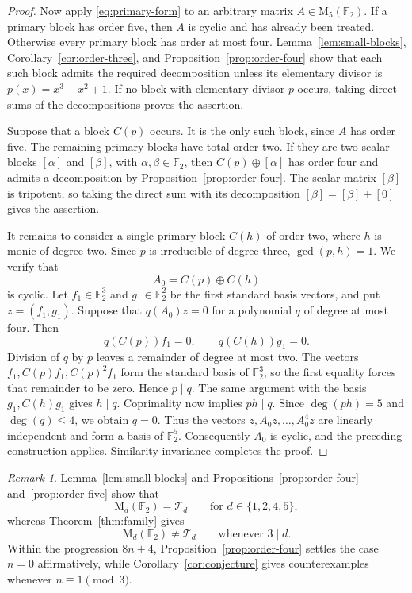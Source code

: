 \documentclass[12pt]{amsart}
\theoremstyle{remark}
\newtheorem{remark}[theorem]{Remark}
\numberwithin{equation}{section}
\theoremstyle{definition}
\newcommand{\F}{\mathbb F}
\newcommand{\Mat}{\mathrm M}
\newcommand{\TS}{\mathcal T}
\begin{document}
\begin{proof}
Now apply \eqref{eq:primary-form} to an arbitrary matrix $A\in\Mat_5(\F_2)$. If a primary block has order five, then $A$ is cyclic and has already been treated. Otherwise every primary block has order at most four. Lemma~\ref{lem:small-blocks}, Corollary~\ref{cor:order-three}, and Proposition~\ref{prop:order-four} show that each such block admits the required decomposition unless its elementary divisor is $p(x)=x^3+x^2+1$. If no block with elementary divisor $p$ occurs, taking direct sums of the decompositions proves the assertion.

Suppose that a block $C(p)$ occurs. It is the only such block, since $A$ has order five. The remaining primary blocks have total order two. If they are two scalar blocks $[\alpha]$ and $[\beta]$, with $\alpha,\beta\in\F_2$, then $C(p)\oplus[\alpha]$ has order four and admits a decomposition by Proposition~\ref{prop:order-four}. The scalar matrix $[\beta]$ is tripotent, so taking the direct sum with its decomposition $[\beta]=[\beta]+[0]$ gives the assertion.

It remains to consider a single primary block $C(h)$ of order two, where $h$ is monic of degree two. Since $p$ is irreducible of degree three, $\gcd(p,h)=1$. We verify that
\[
 A_0=C(p)\oplus C(h)
\]
is cyclic. Let $f_1\in\F_2^3$ and $g_1\in\F_2^2$ be the first standard basis vectors, and put $z=(f_1,g_1)$. Suppose that $q(A_0)z=0$ for a polynomial $q$ of degree at most four. Then
\[
 q(C(p))f_1=0,
 \qquad
 q(C(h))g_1=0.
\]
Division of $q$ by $p$ leaves a remainder of degree at most two. The vectors $f_1,C(p)f_1,C(p)^2f_1$ form the standard basis of $\F_2^3$, so the first equality forces that remainder to be zero. Hence $p\mid q$. The same argument with the basis $g_1,C(h)g_1$ gives $h\mid q$. Coprimality now implies $ph\mid q$. Since $\deg(ph)=5$ and $\deg(q)\leq4$, we obtain $q=0$. Thus the vectors $z,A_0z,\ldots,A_0^4z$ are linearly independent and form a basis of $\F_2^5$. Consequently $A_0$ is cyclic, and the preceding construction applies. Similarity invariance completes the proof.
\end{proof}

\begin{remark}
Lemma~\ref{lem:small-blocks} and Propositions~\ref{prop:order-four} and~\ref{prop:order-five} show that
\[
 \Mat_d(\F_2)=\TS_d
 \qquad\text{for }d\in\{1,2,4,5\},
\]
whereas Theorem~\ref{thm:family} gives
\[
 \Mat_d(\F_2)\neq\TS_d
 \qquad\text{whenever }3\mid d.
\]
Within the progression $8n+4$, Proposition~\ref{prop:order-four} settles the case $n=0$ affirmatively, while Corollary~\ref{cor:conjecture} gives counterexamples whenever $n\equiv1\pmod3$.
\end{remark}
\end{document}
